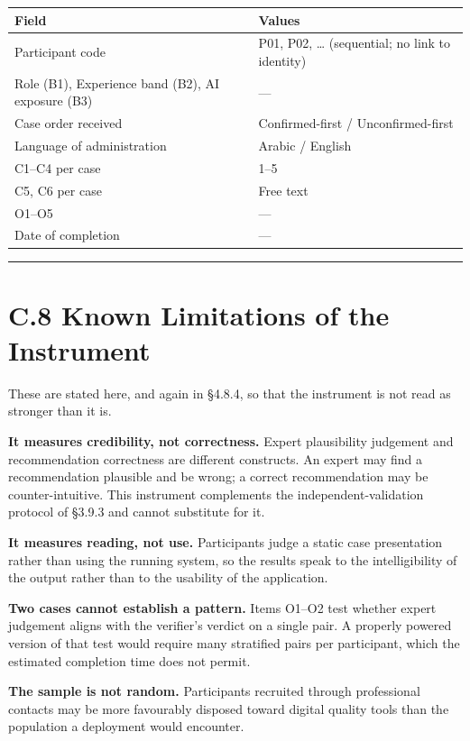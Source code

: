 \begin{longtable}[]{@{}ll@{}}
\toprule\noalign{}
Field & Values \\
\midrule\noalign{}
\endhead
\bottomrule\noalign{}
\endlastfoot
Participant code & P01, P02, \ldots{} (sequential; no link to identity) \\
Role (B1), Experience band (B2), AI exposure (B3) & --- \\
Case order received & Confirmed-first / Unconfirmed-first \\
Language of administration & Arabic / English \\
C1--C4 per case & 1--5 \\
C5, C6 per case & Free text \\
O1--O5 & --- \\
Date of completion & --- \\
\end{longtable}

\begin{center}\rule{0.5\linewidth}{0.5pt}\end{center}

\hypertarget{c.8-known-limitations-of-the-instrument}{%
\section{C.8 Known Limitations of the Instrument}\label{c.8-known-limitations-of-the-instrument}}

These are stated here, and again in §4.8.4, so that the instrument is not read as stronger than it is.

\textbf{It measures credibility, not correctness.} Expert plausibility judgement and recommendation correctness are different constructs. An expert may find a recommendation plausible and be wrong; a correct recommendation may be counter-intuitive. This instrument complements the independent-validation protocol of §3.9.3 and cannot substitute for it.

\textbf{It measures reading, not use.} Participants judge a static case presentation rather than using the running system, so the results speak to the intelligibility of the output rather than to the usability of the application.

\textbf{Two cases cannot establish a pattern.} Items O1--O2 test whether expert judgement aligns with the verifier's verdict on a single pair. A properly powered version of that test would require many stratified pairs per participant, which the estimated completion time does not permit.

\textbf{The sample is not random.} Participants recruited through professional contacts may be more favourably disposed toward digital quality tools than the population a deployment would encounter.
